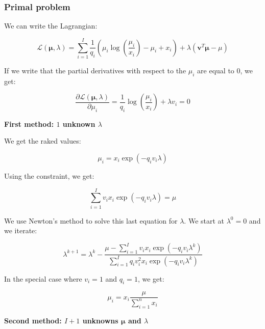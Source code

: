 \documentclass{tex/note}
\begin{document}
\subsubsection{Primal problem}

We can write the Lagrangian:

\begin{equation*}
\mathcal{L} \left( \bm{\mu} , \lambda \right) = \sum_{i = 1}^I \frac{1}{q_i} \left( \mu_i \log \left( \frac{\mu_i}{x_i} \right) - \mu_i + x_i \right) + \lambda \left( \bm{v}^T \bm{\mu} - \mu \right)
\end{equation*}

If we write that the partial derivatives with respect to the $\mu_i$ are equal to $0$, we get:

\begin{equation*}
\frac{\partial \mathcal{L} \left( \bm{\mu} , \lambda \right)}{\partial \mu_i} = \frac{1}{q_i} \log \left( \frac{\mu_i}{x_i} \right) + \lambda v_i = 0
\end{equation*}

\textbf{First method: $1$ unknown $\lambda$}

We get the raked values:

\begin{equation*}
\mu_i = x_i \exp \left( - q_i v_i \lambda \right)
\end{equation*}

Using the constraint, we get:

\begin{equation*}
\sum_{i = 1}^I v_i x_i \exp \left( - q_i v_i \lambda \right) = \mu
\end{equation*}

We use Newton's method to solve this last equation for $\lambda$. We start at $\lambda^0 = 0$ and we iterate:

\begin{equation*}
\lambda^{k + 1} = \lambda^k - \frac{\mu - \sum_{i = 1}^I v_i x_i \exp \left( - q_i v_i \lambda^k \right)}{\sum_{i = 1}^I q_i v_i^2 x_i \exp \left( - q_i v_i \lambda^k \right)}
\end{equation*}

In the special case where $v_i = 1$ and $q_i = 1$, we get:

\begin{equation*}
\mu_i = x_i \frac{\mu}{\sum_{i = 1}^n x_i}
\end{equation*}

\textbf{Second method: $I + 1$ unknowns $\bm{\mu}$ and $\lambda$}
\end{document}
